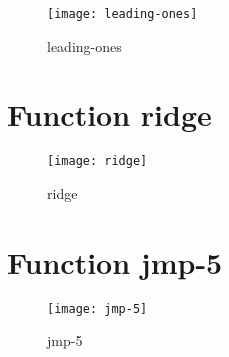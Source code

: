 \begin{center}

\end{center}

\begin{center}

\end{center}

\begin{figure}[h]
\begin{center}
\texttt{[image: leading-ones]}
\caption{leading-ones}
\end{center}
\end{figure}

\newpage

\section{Function ridge}

\begin{center}

\end{center}

\begin{center}

\end{center}

\begin{figure}[h]
\begin{center}
\texttt{[image: ridge]}
\caption{ridge}
\end{center}
\end{figure}

\newpage

\section{Function jmp-5}

\begin{center}

\end{center}

\begin{center}

\end{center}

\begin{figure}[h]
\begin{center}
\texttt{[image: jmp-5]}
\caption{jmp-5}
\end{center}
\end{figure}

